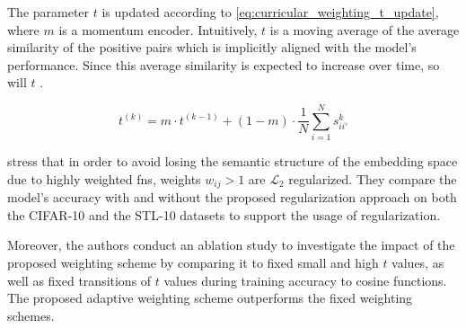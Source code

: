 The parameter $t$ is updated according to \eqref{eq:curricular_weighting_t_update}, where $m$ is a momentum encoder.
Intuitively, $t$ is a moving average of the average similarity of the positive pairs 
which is implicitly aligned with the model's performance. 
Since this average similarity is expected to increase over time, so will $t$ \citet{curricular_weighting_2024}.

\begin{equation}
    t^{(k)} = m \cdot t^{(k-1)} + (1-m) \cdot \frac{1}{N}\sum_{i=1}^{N}s^{k}_{ii'} 
    \label{eq:curricular_weighting_t_update}
\end{equation}

\citeauthor{curricular_weighting_2024} stress that in order to avoid losing the semantic structure of the embedding space 
due to highly weighted \acp{fn}, weights $w_{ij} > 1$ are $\mathcal{L}_2$ regularized.
They compare the model's accuracy with and without the proposed regularization approach on both the CIFAR-10 and the STL-10 datasets 
to support the usage of regularization.

Moreover, the authors conduct an ablation study to investigate the impact of the proposed weighting scheme 
by comparing it to fixed small and high $t$ values, as well as fixed transitions of $t$ values during training accuracy to cosine functions.
The proposed adaptive weighting scheme outperforms the fixed weighting schemes.